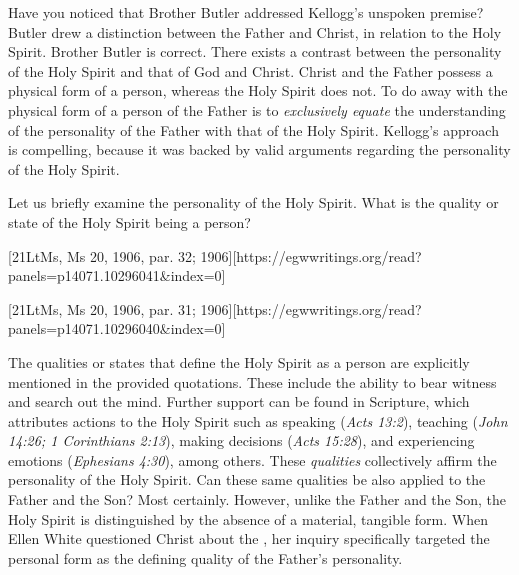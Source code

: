 Have you noticed that Brother Butler addressed Kellogg’s unspoken premise? Butler drew a distinction between the Father and Christ, in relation to the Holy Spirit. Brother Butler is correct. There exists a contrast between the personality of the Holy Spirit and that of God and Christ. Christ and the Father possess a physical form of a person, whereas the Holy Spirit does not. To do away with the physical form of a person of the Father is to \textit{exclusively equate} the understanding of the personality of the Father with that of the Holy Spirit. Kellogg’s approach is compelling, because it was backed by valid arguments regarding the personality of the Holy Spirit.

Let us briefly examine the personality of the Holy Spirit. What is the quality or state of the Holy Spirit being a person?

[21LtMs, Ms 20, 1906, par. 32; 1906][https://egwwritings.org/read?panels=p14071.10296041&index=0]

[21LtMs, Ms 20, 1906, par. 31; 1906][https://egwwritings.org/read?panels=p14071.10296040&index=0]

The qualities or states that define the Holy Spirit as a person are explicitly mentioned in the provided quotations. These include the ability to bear witness and search out the mind. Further support can be found in Scripture, which attributes actions to the Holy Spirit such as speaking (\textit{Acts 13:2}), teaching (\textit{John 14:26; 1 Corinthians 2:13}), making decisions (\textit{Acts 15:28}), and experiencing emotions (\textit{Ephesians 4:30}), among others. These \textit{qualities }collectively affirm the personality of the Holy Spirit. Can these same qualities be also applied to the Father and the Son? Most certainly. However, unlike the Father and the Son, the Holy Spirit is distinguished by the absence of a material, tangible form. When Ellen White questioned Christ about the , her inquiry specifically targeted the personal form as the defining quality of the Father's personality.

